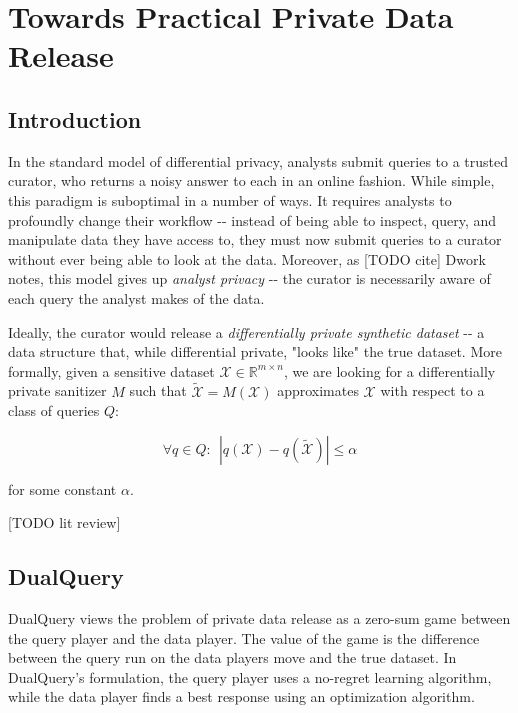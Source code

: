 \documentclass[
]{article}
\date{}
\begin{document}
\hypertarget{header-n0}{%
\section{Towards Practical Private Data Release}\label{header-n0}}

\hypertarget{header-n2}{%
\subsection{Introduction}\label{header-n2}}

In the standard model of differential privacy, analysts submit queries
to a trusted curator, who returns a noisy answer to each in an online
fashion. While simple, this paradigm is suboptimal in a number of ways.
It requires analysts to profoundly change their workflow -\/- instead of
being able to inspect, query, and manipulate data they have access to,
they must now submit queries to a curator without ever being able to
look at the data. Moreover, as {[}TODO cite{]} Dwork notes, this model
gives up \emph{analyst privacy} -\/- the curator is necessarily aware of
each query the analyst makes of the data.

Ideally, the curator would release a \emph{differentially private
synthetic dataset} -\/- a data structure that, while differential
private, "looks like" the true dataset. More formally, given a sensitive
dataset \(\mathcal{X} \in \mathbb{R}^{m\times n}\), we are looking for a
differentially private sanitizer \(M\) such that
\(\tilde{\mathcal{X}} = M(\mathcal{X}) \) approximates \(\mathcal{X}\)
with respect to a class of queries \(Q\):

\[\forall q \in Q : ~~ |q(\mathcal{X}) - q(\tilde{\mathcal{X}})| \leq \alpha\]

for some constant \(\alpha\).

{[}TODO lit review{]}

\hypertarget{header-n14}{%
\subsection{DualQuery }\label{header-n14}}

DualQuery views the problem of private data release as a zero-sum game
between the query player and the data player. The value of the game is
the difference between the query run on the data players move and the
true dataset. In DualQuery's formulation, the query player uses a
no-regret learning algorithm, while the data player finds a best
response using an optimization algorithm.
\end{document}
